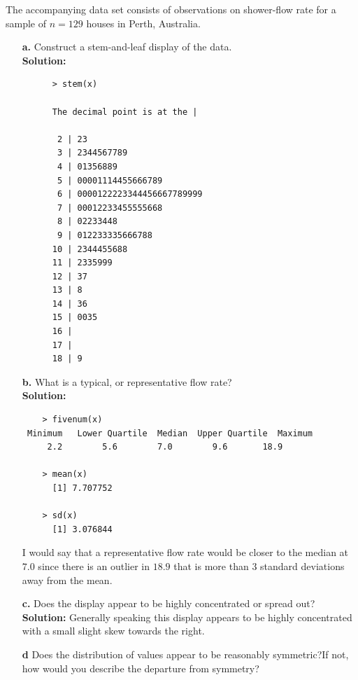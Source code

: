 \documentclass[12pt]{article}
\makeatletter
\theoremstyle{homework}
\newenvironment{exercise}[1]
{\def\@currentlabel{#1}\exercisecore}
{\endexercisecore}
\makeatother
\begin{document}
\begin{exercise}{1.14} The accompanying data set consists of observations on shower-flow rate for a sample of $n = 129$ houses in Perth, Australia.
  \begin{enumerate}
    \item[\textbf{a.}] Construct a stem-and-leaf display of the data.\\
    \textbf{Solution:}
    \begin{lstlisting}
      > stem(x)

      The decimal point is at the |
    
       2 | 23
       3 | 2344567789
       4 | 01356889
       5 | 00001114455666789
       6 | 0000122223344456667789999
       7 | 00012233455555668
       8 | 02233448
       9 | 012233335666788
      10 | 2344455688
      11 | 2335999
      12 | 37
      13 | 8
      14 | 36
      15 | 0035
      16 | 
      17 | 
      18 | 9    
    \end{lstlisting}

    \vspace{.5in}
     
    \item[\textbf{b.}] What is a typical, or representative flow rate?\\
    
    \textbf{Solution:}
    
    \begin{lstlisting}
    > fivenum(x)
 Minimum   Lower Quartile  Median  Upper Quartile  Maximum 
     2.2        5.6        7.0        9.6       18.9 
      
    > mean(x)
      [1] 7.707752
  
    > sd(x)
      [1] 3.076844
    \end{lstlisting}
    I would say that a representative flow rate would be closer to the median at $7.0$ since there is an outlier in $18.9$ that is more than 3 standard deviations away from the mean.
    \vspace{.5in}
     
    \item[\textbf{c.}] Does the display appear to be highly concentrated or spread out?\\
    
    \textbf{Solution:} Generally speaking this display appears to be highly concentrated with a small slight skew towards the right.
    \vspace{.5in}
     

    \item[\textbf{d}] Does the distribution of values appear to be reasonably symmetric?If not, how would you describe the departure from symmetry?\\
    

\end{enumerate}
\end{exercise}
\end{document}
